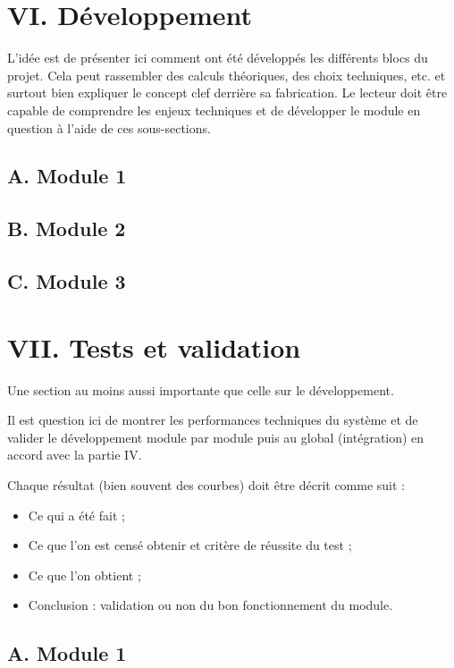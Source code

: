 \documentclass[a4paper,11pt]{book}
\begin{document}
\newpage
\section*{VI. Développement}
L’idée est de présenter ici comment ont été développés les différents blocs du projet. Cela peut rassembler des calculs théoriques, des choix techniques, etc. et surtout bien expliquer le concept clef derrière sa fabrication.
Le lecteur doit être capable de comprendre les enjeux techniques et de développer le module en question à l’aide de ces sous-sections.

\subsection*{A. Module 1}
\subsection*{B. Module 2}
\subsection*{C. Module 3}


\newpage
\section*{VII. Tests et validation}
Une section au moins aussi importante que celle sur le développement.

\vspace{2mm}
\noindent Il est question ici de montrer les performances techniques du système et de valider le développement module par module puis au global (intégration) en accord avec la partie IV.

\vspace{2mm}
\noindent Chaque résultat (bien souvent des courbes) doit être décrit comme suit :
\begin{itemize}
	\item Ce qui a été fait ;
	\item Ce que l’on est censé obtenir et critère de réussite du test ;
	\item Ce que l’on obtient ;
	\item Conclusion : validation ou non du bon fonctionnement du module.
\end{itemize}

\subsection*{A. Module 1}
\end{document}
